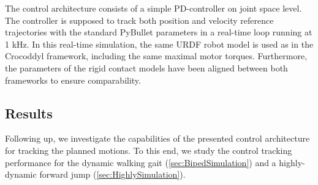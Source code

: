 The control architecture consists of a simple PD-controller on joint space level. The controller is supposed to track both position and velocity reference trajectories with the standard PyBullet parameters in a real-time loop running at 1 kHz. In this real-time simulation, the same URDF robot model is used as in the Crocoddyl framework, including the same maximal motor torques. Furthermore, the parameters of the rigid contact models have been aligned between both frameworks to ensure comparability.

\subsection{Results}
Following up, we investigate the capabilities of the presented control architecture for tracking the planned motions. To this end, we study the control tracking performance for the dynamic walking gait (\cref{sec:BipedSimulation}) and a highly-dynamic forward jump (\cref{sec:HighlySimulation}).

